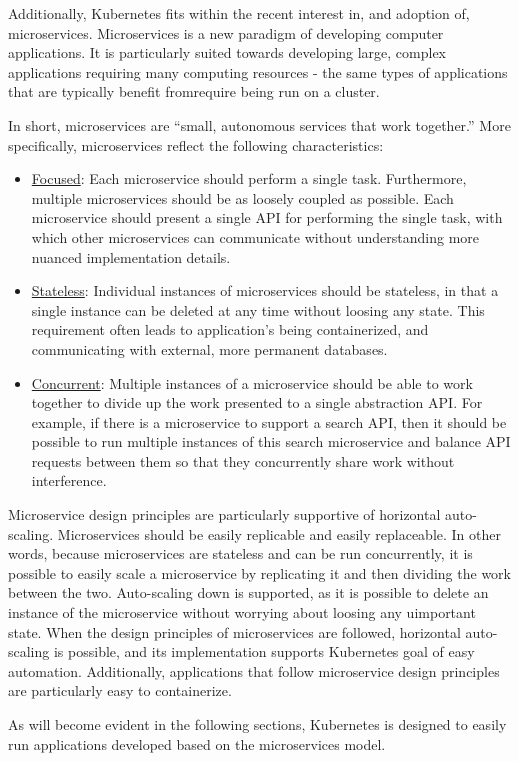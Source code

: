 Additionally, Kubernetes fits within the recent interest in, and adoption of,
microservices. Microservices is a new paradigm of developing computer
applications. It is particularly suited towards developing large, complex
applications requiring many computing resources - the same types of applications
that are typically benefit from\/require being run on a cluster.

In short, microservices are ``small, autonomous services that work
together.''\cite[pg. 2]{building-microservices-designing-fine-grained-systems}
More specifically, microservices reflect the following characteristics:

\begin{itemize}
  \item \underline{Focused}: Each microservice should perform a single task.
    Furthermore, multiple microservices should be as loosely coupled as
    possible. Each microservice should present a single API for performing the
    single task, with which other microservices can communicate without
    understanding more nuanced implementation
    details.\cite{building-microservices-designing-fine-grained-systems}
  \item \underline{Stateless}: Individual instances of microservices should be stateless, in
    that a single instance can be deleted at any time without loosing any state.
    This requirement often leads to application's being containerized, and
    communicating with external, more permanent databases.
  \item \underline{Concurrent}: Multiple instances of a microservice should be
    able to work together to divide up the work presented to a single
    abstraction API. For example, if there is a microservice to support
    a search API, then it should be possible to run multiple instances of this
    search microservice and balance API requests between them so that they
    concurrently share work without interference.
\end{itemize}

Microservice design principles are particularly supportive of horizontal
auto-scaling. Microservices should be easily replicable and easily replaceable.
In other words, because microservices are stateless and can be run concurrently,
it is possible to easily scale a microservice by replicating it and then
dividing the work between the two. Auto-scaling down is supported, as it is
possible to delete an instance of the microservice without worrying about
loosing any uimportant state. When the design principles of
microservices are followed, horizontal auto-scaling is possible, and its
implementation supports Kubernetes goal of easy automation. Additionally,
applications that follow microservice design principles are particularly easy to
containerize.

As will become evident in the following sections, Kubernetes is designed to
easily run applications developed based on the microservices model.
